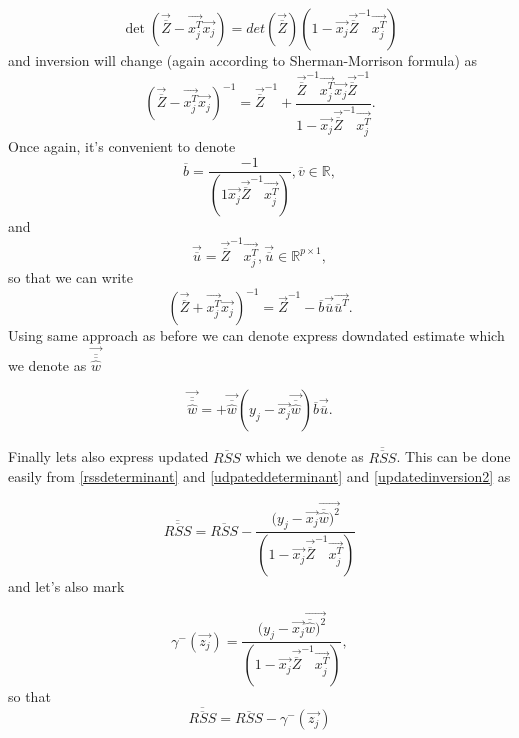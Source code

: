 \begin{equation} 
    \det(\vec{\overline{Z}} - \vec{x_j^T}\vec{x_j}) = det(\vec{\overline{Z}})(1 - \vec{x_j}\vec{\overline{Z}}^{-1}\vec{x_j^T})
\end{equation}
and inversion will change (again according to Sherman-Morrison formula) as 
\begin{equation}  \label{updatedinversion2}
    (\vec{\overline{Z}} - \vec{x_j^T}\vec{x_j})^{-1} = \vec{\overline{Z}}^{-1} + \dfrac{\vec{\overline{Z}}^{-1}\vec{x_j^T}\vec{x_j}\vec{\overline{Z}}^{-1}}{1 - \vec{x_j}\vec{\overline{Z}}^{-1}\vec{x_j^T}}.
\end{equation}
Once again, it's convenient to denote
\begin{equation}
    \overline{b} = \dfrac{-1}{(1  \vec{x_j}\vec{\overline{Z}}^{-1}\vec{x_j^T})},  \overline{v} \in \mathbb{R},
\end{equation}
and 
\begin{equation}
    \vec{\overline{u}} = \vec{\overline{Z}}^{-1}\vec{x_j^T},      \vec{\overline{u}} \in \mathbb{R}^{p \times 1},
\end{equation}
so that we can write
\begin{equation}
    (\vec{\overline{Z}} + \vec{x_j^T}\vec{x_j})^{-1} = \vec{Z}^{-1} - \overline{b}\vec{\overline{u}}\vec{\overline{u}^T}.
\end{equation}
Using same approach as before we can denote express downdated estimate which we denote as $\vec{\overline{\overline{\hat{w}}}}$

\begin{equation} \label{thetaminus}
    \vec{\overline{\overline{\hat{w}}}} =  +\vec{\overline{\hat{w}}} (y_j - \vec{x_j}\vec{\overline{\hat{w}}}) \overline{b} \vec{\overline{u}}.
\end{equation}

Finally lets also express updated $\overline{RSS}$ which we denote as $\overline{\overline{RSS}}$. This can be done easily from \ref{rssdeterminant} and \ref{udpateddeterminant} and \ref{updatedinversion2} as 

\begin{equation}
    \overline{\overline{RSS}} =  \overline{RSS} - \dfrac{(y_j - \vec{x_j}\vec{\overline{\hat{w}})^2}}{(1 - \vec{x_j}\vec{\overline{{Z}}}^{-1}\vec{x_j^T})}
\end{equation}
and let's also mark

\begin{equation}
    \gamma^{-}(\vec{z_j}) = \dfrac{(y_j - \vec{x_j}\vec{\overline{\hat{w}})^2}}{(1 - \vec{x_j}\vec{\overline{{Z}}}^{-1}\vec{x_j^T})},
\end{equation}
so that 
\begin{equation}
    \overline{\overline{RSS}} =  \overline{RSS} - \gamma^{-}(\vec{z_j})
\end{equation}

